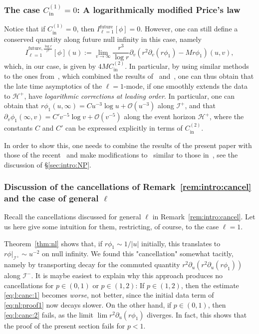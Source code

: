 \documentclass[11pt,english]{article}
\numberwithin{equation}{section}
\theoremstyle{remark}
\theoremstyle{plain}
\theoremstyle{remark}
\newcommand{\pu}{\partial_u}
\newcommand{\pv}{\partial_v}
\renewcommand{\(}{\left(}
\renewcommand{\)}{\right)}
\newcommand{\cc}{C_{\mathrm{in}}^{(1)}}
\newcommand{\ccc}{C_{\mathrm{in}}^{(2)}}
\newcommand{\ILlog}[1]{I_{\ell=#1}^{\mathrm{future},\frac{\log r}{r^3}}}
\begin{document}
\subsubsection{The case \texorpdfstring{$\cc=0$}{Cin,1=0}: A logarithmically modified Price's law}\label{sec:nl:comments:logpricelaw}
Notice that if $\cc=0$, then $I_{\ell=1}^{\mathrm{future}}[\phi]=0$. However,  one can still define a conserved quantity along future null infinity in this case, namely
\begin{equation}
\ILlog1[\phi](u):=\lim_{v\to\infty}\frac{r^3}{\log r}\pv(r^2\pv(r\phi_1)-Mr\phi_1)(u,v),
\end{equation}
which, in our case, is given by $4M\ccc$.
In particular, by using similar methods to the ones from~\cite{II}, which combined the results of~\cite{I} and~\cite{AAG18b}, one can thus obtain that the late time asymptotics of the $\ell=1$-mode, if one smoothly extends the data to $\mathcal{H}^+$, have \textit{logarithmic corrections at leading order}. 
In particular, one can obtain that $r\phi_1(u,\infty)=Cu^{-3}\log u+\mathcal{O}(u^{-3})$ along $\mathcal{I}^+$, and that $\pv\phi_1(\infty,v)=C'v^{-5}\log v+\mathcal{O}(v^{-5})$ along the event horizon $\mathcal{H}^+$, where the constants $C$ and $C'$ can be  expressed explicitly in terms of $\ccc$. 

In order to show this, one needs to combine the results of the present paper with those of the recent~\cite{AAG21} and make modifications to~\cite{AAG21} similar to those in~\cite{II}, see the discussion of \S\ref{sec:intro:NP}.

\subsubsection{Discussion of the cancellations of Remark~\ref{rem:intro:cancel} and the case of general \texorpdfstring{$\ell$}{L}}\label{sec:4.4.3}
Recall the cancellations discussed for general $\ell$ in Remark~\ref{rem:intro:cancel}. 
Let us here give some intuition for them, restricting, of course, to the case $\ell=1$.

 Theorem~\ref{thm:nl} shows that, if $r\phi_1\sim 1/|u|$ initially, this translates to $r\phi|_{\mathcal I^+}\sim u^{-2}$ on null infinity. 
We found this "cancellation" somewhat tacitly, namely by transporting  decay for the commuted quantity $r^2\pu(r^2\pu(r\phi_1))$ along $\mathcal I^-$.  It is maybe easiest to explain why this approach produces no cancellations for $p\in(0,1)$ or $p\in(1,2)$:
If $p\in(1,2)$, then the estimate \eqref{eq:l:canc:1} becomes \textit{worse}, not better, since the initial data term of \eqref{eq:nl:proof1} now decays slower.
On the other hand, if $p\in(0,1)$, then \eqref{eq:l:canc:2} fails, as the limit $\lim r^2\pu(r\phi_1)$ diverges. In fact, this shows that the proof of the present section fails for $p<1$. 
\end{document}
